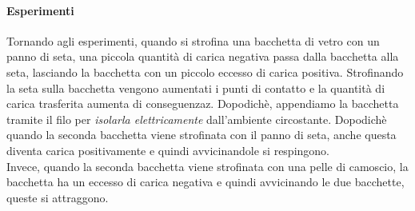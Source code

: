 \documentclass[12pt]{report}
\begin{document}
	\paragraph{Esperimenti} Tornando agli esperimenti, quando si strofina una bacchetta di vetro con un panno di seta, una piccola quantità di carica negativa passa dalla bacchetta alla seta, lasciando la bacchetta con un piccolo eccesso di carica positiva. Strofinando la seta sulla bacchetta vengono aumentati i punti di contatto e la quantità di carica trasferita aumenta di conseguenzaz. Dopodichè, appendiamo la bacchetta tramite il filo per \textit{isolarla elettricamente} dall'ambiente circostante. Dopodichè quando la seconda bacchetta viene strofinata con il panno di seta, anche questa diventa carica positivamente e quindi avvicinandole si respingono. \\
	Invece, quando la seconda bacchetta viene strofinata con una pelle di camoscio, la bacchetta ha un eccesso di carica negativa e quindi avvicinando le due bacchette, queste si attraggono.
\end{document}
